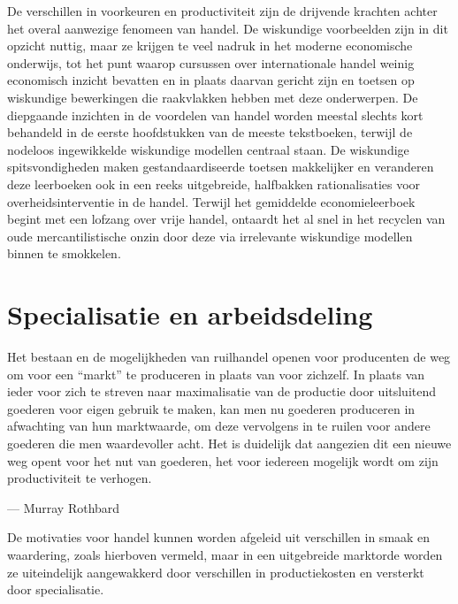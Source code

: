 De verschillen in voorkeuren en productiviteit zijn de drijvende krachten achter het overal aanwezige fenomeen van handel. De wiskundige voorbeelden zijn in dit opzicht nuttig, maar ze krijgen te veel nadruk in het moderne economische onderwijs, tot het punt waarop cursussen over internationale handel weinig economisch inzicht bevatten en in plaats daarvan gericht zijn en toetsen op wiskundige bewerkingen die raakvlakken hebben met deze onderwerpen. De diepgaande inzichten in de voordelen van handel worden meestal slechts kort behandeld in de eerste hoofdstukken van de meeste tekstboeken, terwijl de nodeloos ingewikkelde wiskundige modellen centraal staan. De wiskundige spitsvondigheden maken gestandaardiseerde toetsen makkelijker en veranderen deze leerboeken ook in een reeks uitgebreide, halfbakken rationalisaties voor overheidsinterventie in de handel. Terwijl het gemiddelde economieleerboek begint met een lofzang over vrije handel, ontaardt het al snel in het recyclen van oude mercantilistische onzin door deze via irrelevante wiskundige modellen binnen te smokkelen.

\hypertarget{specialisatie-en-arbeidsverdeling}{%
\section{Specialisatie en arbeidsdeling}\label{specialisatie-en-arbeidsverdeling}}

\begin{blockquotebox}
    Het bestaan en de mogelijkheden van ruilhandel openen voor producenten de weg om voor een ``markt'' te produceren in plaats van voor zichzelf. In plaats van ieder voor zich te streven naar maximalisatie van de productie door uitsluitend goederen voor eigen gebruik te maken, kan men nu goederen produceren in afwachting van hun marktwaarde, om deze vervolgens in te ruilen voor andere goederen die men waardevoller acht. Het is duidelijk dat aangezien dit een nieuwe weg opent voor het nut van goederen, het voor iedereen mogelijk wordt om zijn productiviteit te verhogen.\footnotemark
    \par\raggedleft--- Murray Rothbard
\end{blockquotebox}

De motivaties voor handel kunnen worden afgeleid uit verschillen in smaak en waardering, zoals hierboven vermeld, maar in een uitgebreide marktorde worden ze uiteindelijk aangewakkerd door verschillen in productiekosten en versterkt door specialisatie.

